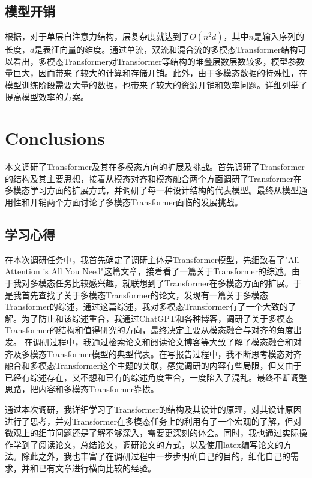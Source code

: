 \documentclass[journal]{IEEEtran}
\begin{document}
\subsection{模型开销} 根据\cite{vaswani2017attention}，对于单层自注意力结构，层复杂度就达到了$O(n^2d)$，其中$n$是输入序列的长度，$d$是表征向量的维度。通过单流，双流和混合流的多模态Transformer结构可以看出，多模态Transformer对Transformer等结构的堆叠层数层数较多，模型参数量巨大，因而带来了较大的计算和存储开销。此外，由于多模态数据的特殊性，在模型训练阶段需要大量的数据，也带来了较大的资源开销和效率问题。\cite{10123038}详细列举了提高模型效率的方案。


\section{Conclusions}
本文调研了Transformer及其在多模态方向的扩展及挑战。首先调研了Transformer的结构及其主要思想，接着从模态对齐和模态融合两个方面调研了Transformer在多模态学习方面的扩展方式，并调研了每一种设计结构的代表模型。最终从模型通用性和开销两个方面讨论了多模态Transformer面临的发展挑战。

\subsection{学习心得}
在本次调研任务中，我首先确定了调研主体是Transformer模型，先细致看了"All Attention is All You Need"这篇文章，接着看了一篇关于Transformer的综述。由于我对多模态任务比较感兴趣，就联想到了Transformer在多模态方面的扩展。于是我首先查找了关于多模态Transformer的论文，发现有一篇关于多模态Transformer的综述，通过这篇综述，我对多模态Transformer有了一个大致的了解。为了防止和该综述重合，我通过ChatGPT和各种博客，调研了关于多模态Transformer的结构和值得研究的方向，最终决定主要从模态融合与对齐的角度出发。
在调研过程中，我通过检索论文和阅读论文博客等大致了解了模态融合和对齐及多模态Transformer模型的典型代表。在写报告过程中，我不断思考模态对齐融合和多模态Transformer这个主题的关联，感觉调研的内容有些局限，但又由于已经有综述存在，又不想和已有的综述角度重合，一度陷入了混乱。最终不断调整思路，把内容和多模态Transformer靠拢。

通过本次调研，我详细学习了Transformer的结构及其设计的原理，对其设计原因进行了思考，并对Transformer在多模态任务上的利用有了一个宏观的了解，但对微观上的细节问题还是了解不够深入，需要更深刻的体会。同时，我也通过实际操作学到了阅读论文，总结论文，调研论文的方式，以及使用latex编写论文的方法。除此之外，我也丰富了在调研过程中一步步明确自己的目的，细化自己的需求，并和已有文章进行横向比较的经验。

\appendices


\end{document}
